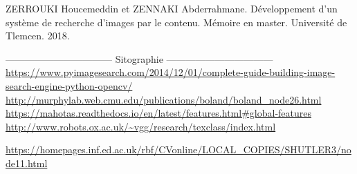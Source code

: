 \documentclass[
openany,
11pt, %
french, %
singlespacing, %
headsepline, %
]{MastersDoctoralThesis} %
\begin{document}
\begin{thebibliography}{widest entry}
	  ZERROUKI Houcemeddin et ZENNAKI Abderrahmane. Développement d’un système de recherche d’images par le contenu. Mémoire en master. Université de Tlemcen. 2018.
	
	
	--------------------------------- Sitographie ---------------------------------
	 \url{https://www.pyimagesearch.com/2014/12/01/complete-guide-building-image-search-engine-python-opencv/}
	 \url{http://murphylab.web.cmu.edu/publications/boland/boland_node26.html}
	 \url{https://mahotas.readthedocs.io/en/latest/features.html#global-features}
	 \url{http://www.robots.ox.ac.uk/~vgg/research/texclass/index.html}
	
	 \url{https://homepages.inf.ed.ac.uk/rbf/CVonline/LOCAL_COPIES/SHUTLER3/node11.html}
	
\end{thebibliography}
\end{document}
